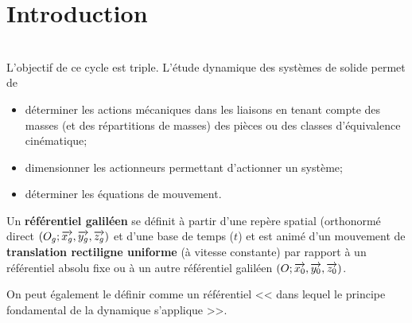 \documentclass[10pt,fleqn]{article} %
\begin{document}

\setlength{\columnseprule}{.1pt}

\vspace{2cm}
\pagestyle{fancy}
\thispagestyle{plain}


\section{Introduction}
\begin{obj} ~\\
L'objectif de ce cycle est triple. L'étude dynamique des systèmes de solide permet de 
\begin{itemize}
\item déterminer les actions mécaniques dans les liaisons en tenant compte des masses (et des répartitions de masses) des pièces ou des classes d'équivalence cinématique;
\item dimensionner les actionneurs permettant d'actionner un système; 
\item déterminer les équations de mouvement.
\end{itemize}
\end{obj}


\begin{definition}
Un \textbf{référentiel galiléen} se définit à partir d'une repère spatial (orthonormé direct $\left(O_g;\overrightarrow{x_g},\overrightarrow{y_g},\overrightarrow{z_g} \right)$ et d'une base de temps ($t$) et est animé d'un mouvement de \textbf{translation rectiligne uniforme} (à vitesse constante) par rapport à un référentiel absolu fixe ou à un autre référentiel galiléen $\left(O;\overrightarrow{x_0},\overrightarrow{y_0},\overrightarrow{z_0} \right)$. 

On peut également le définir comme un référentiel << dans lequel le principe fondamental de la dynamique s'applique >>.
\end{definition}
\end{document}
